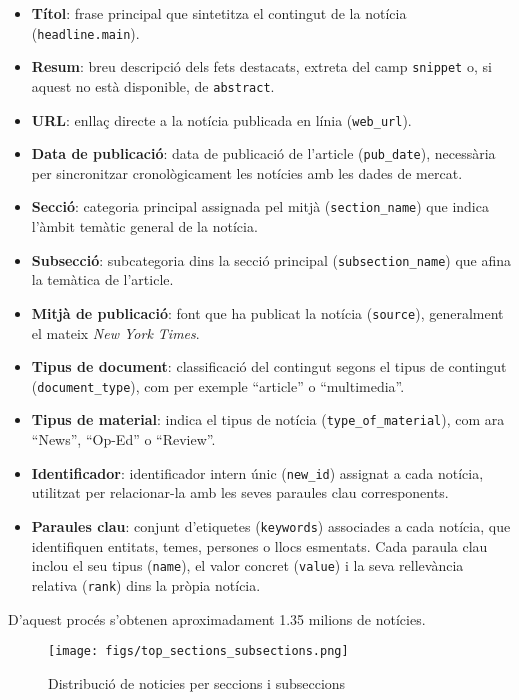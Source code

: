 \documentclass[12pt,a4paper,twoside]{book}
\begin{document}
\begin{itemize}
    \item \textbf{Títol}: frase principal que sintetitza el contingut de la notícia (\texttt{headline.main}).
    \item \textbf{Resum}: breu descripció dels fets destacats, extreta del camp \texttt{snippet} o, si aquest no està disponible, de \texttt{abstract}.
    \item \textbf{URL}: enllaç directe a la notícia publicada en línia (\texttt{web\_url}).
    \item \textbf{Data de publicació}: data de publicació de l'article (\texttt{pub\_date}), necessària per sincronitzar cronològicament les notícies amb les dades de mercat.
    \item \textbf{Secció}: categoria principal assignada pel mitjà (\texttt{section\_name}) que indica l'àmbit temàtic general de la notícia.
    \item \textbf{Subsecció}: subcategoria dins la secció principal (\texttt{subsection\_name}) que afina la temàtica de l'article.
    \item \textbf{Mitjà de publicació}: font que ha publicat la notícia (\texttt{source}), generalment el mateix \textit{New York Times}.
    \item \textbf{Tipus de document}: classificació del contingut segons el tipus de contingut (\texttt{document\_type}), com per exemple “article” o “multimedia”.
    \item \textbf{Tipus de material}: indica el tipus de notícia (\texttt{type\_of\_material}), com ara “News”, “Op-Ed” o “Review”.
    \item \textbf{Identificador}: identificador intern únic (\texttt{new\_id}) assignat a cada notícia, utilitzat per relacionar-la amb les seves paraules clau corresponents.
    \item \textbf{Paraules clau}: conjunt d'etiquetes (\texttt{keywords}) associades a cada notícia, que identifiquen entitats, temes, persones o llocs esmentats. Cada paraula clau inclou el seu tipus (\texttt{name}), el valor concret (\texttt{value}) i la seva rellevància relativa (\texttt{rank}) dins la pròpia notícia.
\end{itemize}

D'aquest procés s'obtenen aproximadament 1.35 milions de notícies.

\begin{figure}[H]
	\centering
	\texttt{[image: figs/top\_sections\_subsections.png]}
	\caption{Distribució de noticies per seccions i subseccions}
	\label{fig:context-anoni1}
\end{figure}
\end{document}
